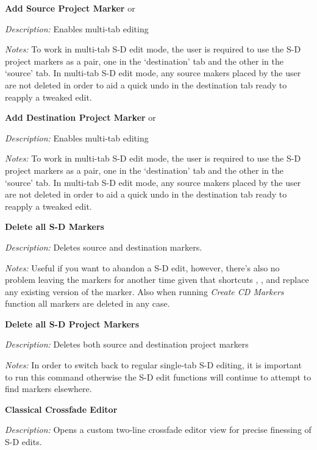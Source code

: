 \documentclass[10pt,american]{article}
\begin{document}
\textbf{Add Source Project Marker } or 

\emph{Description:} Enables multi-tab editing

\emph{Notes: }To work in multi-tab S-D edit mode, the user is required to use
the S-D project markers as a pair, one in the `destination' tab and the other in
the `source' tab. In multi-tab S-D edit mode, any source makers placed by the
user are not deleted in order to aid a quick undo in the destination tab ready
to reapply a tweaked edit.

\textbf{Add Destination Project Marker } or

\emph{Description:} Enables multi-tab editing

\emph{Notes: }To work in multi-tab S-D edit mode, the user is required to use
the S-D project markers as a pair, one in the `destination' tab and the other in
the `source' tab. In multi-tab S-D edit mode, any source makers placed by the
user are not deleted in order to aid a quick undo in the destination tab ready
to reapply a tweaked edit.

\textbf{Delete all S-D Markers }\keys{\ctrl+\del}

\emph{Description: }Deletes source and destination markers.

\emph{Notes: }Useful if you want to abandon a S-D edit, however, there's also no
problem leaving the markers for another time given that shortcuts 
, , and  replace any existing version of the marker.
Also when running \emph{Create CD Markers} function all markers are deleted in
any case.

\textbf{Delete all S-D Project Markers }\keys{\shift+\del}

\emph{Description:} Deletes both source and destination project markers

\emph{Notes: }In order to switch back to regular single-tab S-D editing, it is
important to run this command otherwise the S-D edit functions will continue to
attempt to find markers elsewhere.

\textbf{Classical Crossfade Editor }

\emph{Description: }Opens a custom two-line crossfade editor view for precise
finessing of S-D edits.
\end{document}
